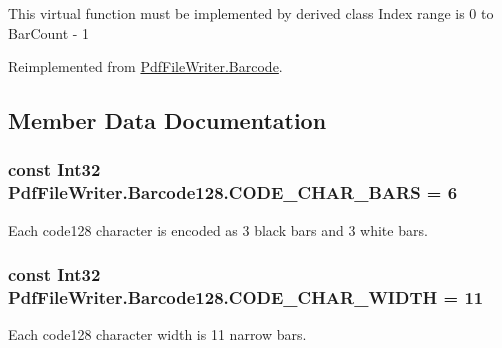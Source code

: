 This virtual function must be implemented by derived class Index range is 0 to Bar\+Count -\/ 1

Reimplemented from \hyperlink{class_pdf_file_writer_1_1_barcode_adf11f62c74801b9d146c4eb430f7ba25}{Pdf\+File\+Writer.\+Barcode}.



\subsection{Member Data Documentation}
\subsubsection[{\texorpdfstring{C\+O\+D\+E\+\_\+\+C\+H\+A\+R\+\_\+\+B\+A\+RS}{CODE_CHAR_BARS}}]{\setlength{\rightskip}{0pt plus 5cm}const Int32 Pdf\+File\+Writer.\+Barcode128.\+C\+O\+D\+E\+\_\+\+C\+H\+A\+R\+\_\+\+B\+A\+RS = 6}\hypertarget{class_pdf_file_writer_1_1_barcode128_a88bfc10bac4a96d9af356afd696957a4}{}\label{class_pdf_file_writer_1_1_barcode128_a88bfc10bac4a96d9af356afd696957a4}


Each code128 character is encoded as 3 black bars and 3 white bars. 

\subsubsection[{\texorpdfstring{C\+O\+D\+E\+\_\+\+C\+H\+A\+R\+\_\+\+W\+I\+D\+TH}{CODE_CHAR_WIDTH}}]{\setlength{\rightskip}{0pt plus 5cm}const Int32 Pdf\+File\+Writer.\+Barcode128.\+C\+O\+D\+E\+\_\+\+C\+H\+A\+R\+\_\+\+W\+I\+D\+TH = 11}\hypertarget{class_pdf_file_writer_1_1_barcode128_a44dce9c13100a3d93cf13d039a9cc640}{}\label{class_pdf_file_writer_1_1_barcode128_a44dce9c13100a3d93cf13d039a9cc640}


Each code128 character width is 11 narrow bars. 

